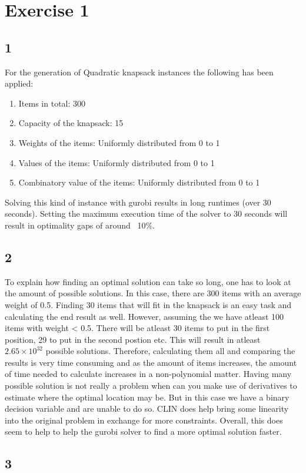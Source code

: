 \section*{Exercise 1}
\subsection*{1}
For the generation of Quadratic knapsack instances the following has been applied:
\begin{enumerate}
	\item Items in total: 300
	\item Capacity of the knapsack: 15
	\item Weights of the items: Uniformly distributed from 0 to 1
	\item Values of the items: Uniformly distributed from 0 to 1
	\item Combinatory value of the items: Uniformly distributed from 0 to 1
\end{enumerate}
Solving this kind of instance with gurobi results in long runtimes (over 30 seconds). Setting the maximum execution time of the solver to 30 seconds will result in optimality gaps of around ~10\%.
\subsection*{2}
To explain how finding an optimal solution can take so long, one has to look at the amount of possible solutions. In this case, there are 300 items with an average weight of 0.5. Finding 30 items that will fit in the knapsack is an easy task and calculating the end result as well. However, assuming the we have atleast 100 items with weight < 0.5. There will be atleast 30 items to put in the first position, 29 to put in the second postion etc. This will result in atleast $2.65 \times 10^{32}$ possible solutions. Therefore, calculating them all and comparing the results is very time consuming and as the amount of items increases, the amount of time needed to calculate increases in a non-polynomial matter. Having many possible solution is not really a problem when can you make use of derivatives to estimate where the optimal location may be. But in this case we have a binary decision variable and are unable to do so. CLIN does help bring some linearity into the original problem in exchange for more constraints. Overall, this does seem to help to help the gurobi solver to find a more optimal solution faster.
\subsection*{3}

